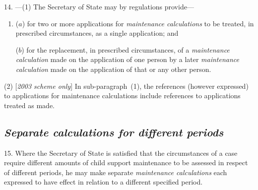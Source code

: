 \documentclass[12pt,a4paper]{article}
\begin{document}
14.%
---(1)   %
The Secretary of State may by regulations provide—
\begin{enumerate}\item[]
($a$) for two or more applications for 
\emph{maintenance calculations}  %
to be treated, in prescribed circumstances, as a single application; and

($b$) for the replacement, in prescribed circumstances, of a 
\emph{maintenance calculation}  %
made on the application of one person by a later 
\emph{maintenance calculation}  %
made on the application of that or any other person.
\end{enumerate}

(2) [\emph{2003 scheme only}] In sub-paragraph~(1), the references (however expressed) to applications for maintenance calculations include references to applications treated as made.


\subsection*{\itshape Separate 
\emph{calculations}  %
for different periods}

15. Where 
the Secretary of State  %
is satisfied that the circumstances of a case require different amounts of child support maintenance to be assessed in respect of different periods, he may make separate 
\emph{maintenance calculations}  %
each expressed to have effect in relation to a different specified period.

\end{document}
